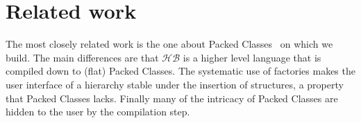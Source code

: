 \documentclass[a4paper,UKenglish,cleveref, autoref]{lipics-v2019}
\newcommand{\HB}{\ensuremath{\mathcal{HB}}}
\newcommand{\mixin}{mixin}
\newcommand{\factories}{factories}
\theoremstyle{implem}
\theoremstyle{implem}
\theoremstyle{command}
\begin{document}
{{%
% 
% 
% 
% 

\section{Related work}
The most closely related work is the one about Packed Classes~\cite{DBLP:conf/tphol/GarillotGMR09} on which we
build. The main differences are that \HB{} is a higher level language
that is compiled down to (flat) Packed Classes. The systematic use of
\factories{} makes the user interface of a hierarchy stable under the insertion of
structures, a property that Packed Classes lacks.
Finally many of the intricacy of Packed Classes are hidden to the user by
the compilation step.

}}
\end{document}
